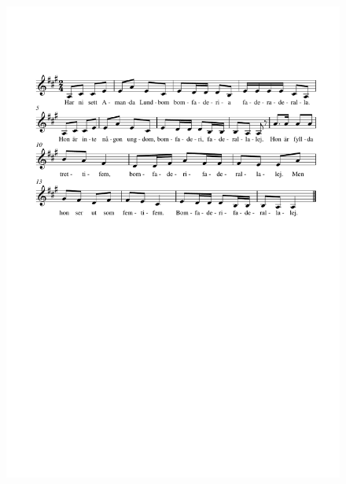 \documentclass[a6paper,11pt]{article}
\begin{document}
\setlength{\oddsidemargin}{-0.47in}
\begin{center}
\end{center}
\vspace{-40pt}
\begin{figure}[!h]
\centering
\includegraphics[width=\textwidth]{amandalundbom}
\end{figure}
\end{document}
